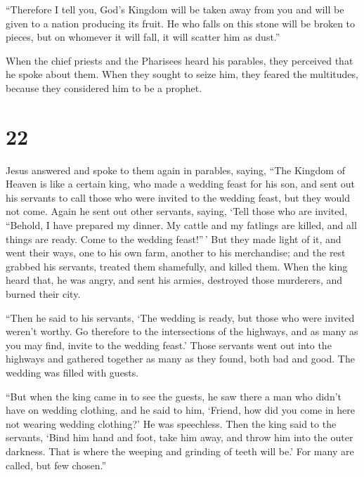  ``Therefore I tell you, God's Kingdom will be taken away
from you and will be given to a nation producing its fruit.
 He who falls on this stone will be broken to pieces, but
on whomever it will fall, it will scatter him as dust.''

 When the chief priests and the Pharisees heard his
parables, they perceived that he spoke about them.  When
they sought to seize him, they feared the multitudes, because they
considered him to be a prophet.

\hypertarget{section-21}{%
\section{22}\label{section-21}}

 Jesus answered and spoke to them again in parables, saying,
 ``The Kingdom of Heaven is like a certain king, who made a
wedding feast for his son,  and sent out his servants to
call those who were invited to the wedding feast, but they would not
come.  Again he sent out other servants, saying, `Tell those
who are invited, ``Behold, I have prepared my dinner. My cattle and my
fatlings are killed, and all things are ready. Come to the wedding
feast!''\,'  But they made light of it, and went their ways,
one to his own farm, another to his merchandise;  and the
rest grabbed his servants, treated them shamefully, and killed them.
 When the king heard that, he was angry, and sent his
armies, destroyed those murderers, and burned their city.

 ``Then he said to his servants, `The wedding is ready, but
those who were invited weren't worthy.  Go therefore to the
intersections of the highways, and as many as you may find, invite to
the wedding feast.'  Those servants went out into the
highways and gathered together as many as they found, both bad and good.
The wedding was filled with guests.

 ``But when the king came in to see the guests, he saw
there a man who didn't have on wedding clothing,  and he
said to him, `Friend, how did you come in here not wearing wedding
clothing?' He was speechless.  Then the king said to the
servants, `Bind him hand and foot, take him away, and throw him into the
outer darkness. That is where the weeping and grinding of teeth will
be.'  For many are called, but few chosen.''

